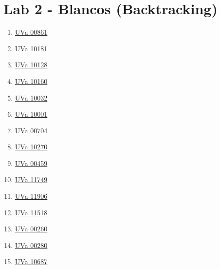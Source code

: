\section{Lab 2 - Blancos (Backtracking)}
        \begin{enumerate}
\item \href{https://onlinejudge.org/index.php?option=com_onlinejudge&Itemid=8&page=show_problem&problem=802}{UVa 00861}
\item \href{https://onlinejudge.org/index.php?option=com_onlinejudge&Itemid=8&page=show_problem&problem=1122}{UVa 10181}
\item \href{https://onlinejudge.org/index.php?option=com_onlinejudge&Itemid=8&page=show_problem&problem=1069}{UVa 10128}
\item \href{https://onlinejudge.org/index.php?option=com_onlinejudge&Itemid=8&page=show_problem&problem=1101}{UVa 10160}
\item \href{https://onlinejudge.org/index.php?option=com_onlinejudge&Itemid=8&page=show_problem&problem=973}{UVa 10032}
\item \href{https://onlinejudge.org/index.php?option=com_onlinejudge&Itemid=8&page=show_problem&problem=942}{UVa 10001}
\item \href{https://onlinejudge.org/index.php?option=com_onlinejudge&Itemid=8&page=show_problem&problem=645}{UVa 00704}
\item \href{https://onlinejudge.org/index.php?option=com_onlinejudge&Itemid=8&page=show_problem&problem=1211}{UVa 10270}
\item \href{https://onlinejudge.org/index.php?option=com_onlinejudge&Itemid=8&page=show_problem&problem=400}{UVa 00459}
\item \href{https://onlinejudge.org/index.php?option=com_onlinejudge&Itemid=8&page=show_problem&problem=2849}{UVa 11749}
\item \href{https://onlinejudge.org/index.php?option=com_onlinejudge&Itemid=8&page=show_problem&problem=3057}{UVa 11906}
\item \href{https://onlinejudge.org/index.php?option=com_onlinejudge&Itemid=8&page=show_problem&problem=2513}{UVa 11518}
\item \href{https://onlinejudge.org/index.php?option=com_onlinejudge&Itemid=8&page=show_problem&problem=196}{UVa 00260}
\item \href{https://onlinejudge.org/index.php?option=com_onlinejudge&Itemid=8&page=show_problem&problem=216}{UVa 00280}
\item \href{https://onlinejudge.org/index.php?option=com_onlinejudge&Itemid=8&page=show_problem&problem=1628}{UVa 10687}

\end{enumerate}
